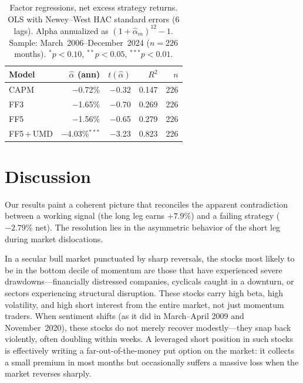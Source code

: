 \documentclass[11pt]{article}
\begin{document}
\begin{table}[!ht]
\centering
\caption{Factor regressions, net excess strategy returns. OLS with Newey--West
         HAC standard errors (6 lags). Alpha annualized as $(1 + \hat\alpha_m)^{12} - 1$.
         Sample: March~2006--December~2024 ($n = 226$ months).
         $^{*}p{<}0.10$, $^{**}p{<}0.05$, $^{***}p{<}0.01$.}
\label{tab:ff}
\begin{tabular}{lrrrr}
\toprule
Model & $\hat\alpha$ (ann) & $t(\hat\alpha)$ & $R^2$ & $n$ \\
\midrule
CAPM        & $-$0.72\%          & $-$0.32        & 0.147 & 226 \\
FF3         & $-$1.65\%          & $-$0.70        & 0.269 & 226 \\
FF5         & $-$1.56\%          & $-$0.65        & 0.279 & 226 \\
FF5\,+\,UMD & $-$4.03\%$^{***}$  & $-$3.23        & 0.823 & 226 \\
\bottomrule
\end{tabular}
\end{table}

\section{Discussion}
\label{sec:discussion}

Our results paint a coherent picture that reconciles the apparent contradiction between
a working signal (the long leg earns $+7.9\%$) and a failing strategy ($-2.79\%$ net).
The resolution lies in the asymmetric behavior of the short leg during market dislocations.

In a secular bull market punctuated by sharp reversals, the stocks most likely to be in
the bottom decile of momentum are those that have experienced severe drawdowns---financially
distressed companies, cyclicals caught in a downturn, or sectors experiencing structural
disruption. These stocks carry high beta, high volatility, and high short interest from
the entire market, not just momentum traders. When sentiment shifts (as it did in March--April
2009 and November~2020), these stocks do not merely recover modestly---they snap back
violently, often doubling within weeks. A leveraged short position in such stocks is
effectively writing a far-out-of-the-money put option on the market: it collects a
small premium in most months but occasionally suffers a massive loss when the market
reverses sharply.
\end{document}
